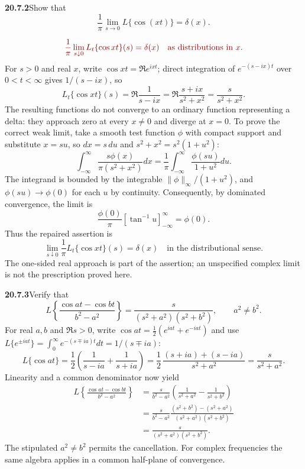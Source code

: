 \par\bigskip
\noindent\textbf{20.7.2}\quad Show that
\[
\frac1\pi\lim_{s\to0}L\{\cos(xt)\}=\delta(x).
\]
\par{}
\[
\erratum{\frac1\pi\lim_{s\downarrow0}L_t\{\cos xt\}(s)=\delta(x)
\quad\text{as distributions in }x.}
\]
\solution
{}
For $s>0$ and real $x$, write $\cos xt=\Re e^{ixt}$; direct
integration of $e^{-(s-ix)t}$ over $0<t<\infty$ gives $1/(s-ix)$,
so
\[
L_t\{\cos xt\}(s)=\Re\frac1{s-ix}=\Re\frac{s+ix}{s^2+x^2}
=\frac{s}{s^2+x^2}.
\]
The resulting functions do not converge to an ordinary
function representing a delta: they approach zero at every
$x\ne0$ and diverge at $x=0$. To prove the correct weak limit,
take a smooth test function $\phi$ with compact support and
substitute $x=su$, so $dx=s\,du$ and $s^2+x^2=s^2(1+u^2)$:
\[
\int_{-\infty}^{\infty}\frac{s\phi(x)}{\pi(s^2+x^2)}dx
=\frac1\pi\int_{-\infty}^{\infty}\frac{\phi(su)}{1+u^2}du.
\]
The integrand is bounded by the integrable
$\|\phi\|_\infty/(1+u^2)$, and $\phi(su)\to\phi(0)$ for each $u$
by continuity. Consequently, by dominated convergence, the limit is
\[
\frac{\phi(0)}\pi[\tan^{-1}u]_{-\infty}^{\infty}=\phi(0).
\]
Thus the repaired assertion is
\[
\boxed{\lim_{s\downarrow0}\frac1\pi L_t\{\cos xt\}(s)
=\delta(x)\quad\text{in the distributional sense}.}
\]
The one-sided real approach is part of the assertion; an
unspecified complex limit is not the prescription proved here.

\par\bigskip
\noindent\textbf{20.7.3}\quad Verify that
\[
L\left\{\frac{\cos at-\cos bt}{b^{2}-a^{2}}\right\}
=\frac{s}{(s^{2}+a^{2})(s^{2}+b^{2})},\qquad a^{2}\ne b^{2}.
\]
\solution
For real $a,b$ and $\Re s>0$, write
$\cos at=\frac12(e^{iat}+e^{-iat})$ and use
$L\{e^{\pm iat}\}=\int_0^\infty e^{-(s\mp ia)t}dt=1/(s\mp ia)$:
\[
L\{\cos at\}=\frac12\left(\frac1{s-ia}+\frac1{s+ia}\right)
=\frac12\,\frac{(s+ia)+(s-ia)}{s^2+a^2}
=\frac{s}{s^2+a^2}.
\]
Linearity and a common denominator now yield
\begin{align*}
L\left\{\frac{\cos at-\cos bt}{b^2-a^2}\right\}
&=\frac{s}{b^2-a^2}\left(\frac1{s^2+a^2}-\frac1{s^2+b^2}\right)\\
&=\frac{s}{b^2-a^2}
\frac{(s^2+b^2)-(s^2+a^2)}{(s^2+a^2)(s^2+b^2)}\\
&=\boxed{\frac{s}{(s^2+a^2)(s^2+b^2)}}.
\end{align*}
The stipulated $a^2\ne b^2$ permits the cancellation. For
complex frequencies the same algebra applies in a common
half-plane of convergence.

